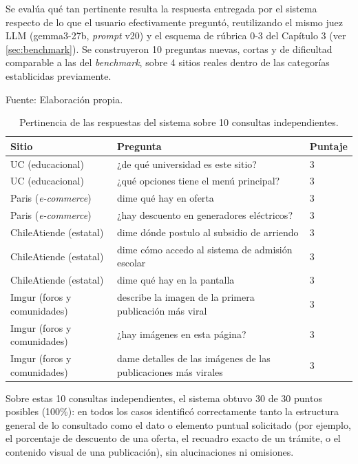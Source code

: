 Se evalúa qué tan pertinente resulta la respuesta entregada por el sistema respecto de lo que el usuario efectivamente preguntó, reutilizando el mismo juez LLM (gemma3-27b, \textit{prompt} v20) y el esquema de rúbrica 0-3 del Capítulo 3 (ver \ref{sec:benchmark}). Se construyeron 10 preguntas nuevas, cortas y de dificultad comparable a las del \textit{benchmark}, sobre 4 sitios reales dentro de las categorías establicidas previamente.

\begin{table}[h]
    \centering
    \caption{\label{table:pertinenciarespuestas} Pertinencia de las respuestas del sistema sobre 10 consultas independientes.} Fuente: Elaboración propia.
    \begin{tabular}{|p{2.3cm}|p{7cm}|p{1.7cm}|}
        \hline
        \textbf{Sitio} & \textbf{Pregunta} & \textbf{Puntaje} \\
        \hline
        UC (educacional) & ¿de qué universidad es este sitio? & 3 \\
        \hline
        UC (educacional) & ¿qué opciones tiene el menú principal? & 3 \\
        \hline
        Paris (\textit{e-commerce}) & dime qué hay en oferta & 3 \\
        \hline
        Paris (\textit{e-commerce}) & ¿hay descuento en generadores eléctricos? & 3 \\
        \hline
        ChileAtiende (estatal) & dime dónde postulo al subsidio de arriendo & 3 \\
        \hline
        ChileAtiende (estatal) & dime cómo accedo al sistema de admisión escolar & 3 \\
        \hline
        ChileAtiende (estatal) & dime qué hay en la pantalla & 3 \\
        \hline
        Imgur (foros y comunidades) & describe la imagen de la primera publicación más viral & 3 \\
        \hline
        Imgur (foros y comunidades) & ¿hay imágenes en esta página? & 3 \\
        \hline
        Imgur (foros y comunidades) & dame detalles de las imágenes de las publicaciones más virales & 3 \\
        \hline
    \end{tabular}
\end{table}

Sobre estas 10 consultas independientes, el sistema obtuvo 30 de 30 puntos posibles (100\%): en todos los casos identificó correctamente tanto la estructura general de lo consultado como el dato o elemento puntual solicitado (por ejemplo, el porcentaje de descuento de una oferta, el recuadro exacto de un trámite, o el contenido visual de una publicación), sin alucinaciones ni omisiones.

